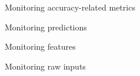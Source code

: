 \begin{frame}{Monitoring accuracy-related metrics}
  \begin{withmargin}
    \begin{tdmain}
    \end{tdmain}
    \begin{tdmargin}
    \end{tdmargin}
  \end{withmargin}
\end{frame}

\begin{frame}{Monitoring predictions}
  \begin{tdblock}
  \end{tdblock}
  \begin{takeaway}
  \end{takeaway}
\end{frame}

\begin{frame}{Monitoring features}
  \begin{withmargin}
    \begin{tdmain}
      \begin{tdcode}
      \end{tdcode}
    \end{tdmain}
    \begin{tdmargin}
    \end{tdmargin}
  \end{withmargin}
\end{frame}

\begin{frame}{Monitoring raw inputs}
  \begin{withmargin}
    \begin{tdmain}
    \end{tdmain}
    \begin{tdmargin}
    \end{tdmargin}
  \end{withmargin}
\end{frame}

